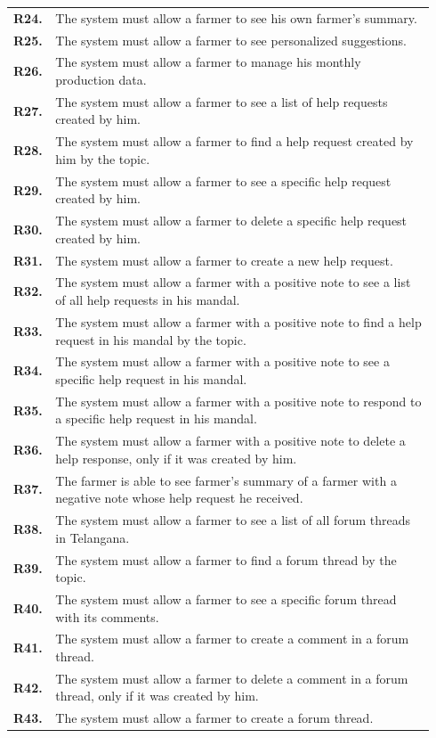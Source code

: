 \begin{longtable}{@{}p{0.06\linewidth} p{0.88\linewidth}}
	\textbf{R24.} & The system must allow a farmer to see his own farmer's summary.\\
	\textbf{R25.} & The system must allow a farmer to see personalized suggestions.\\
	\textbf{R26.} & The system must allow a farmer to manage his monthly production data.\\
	\textbf{R27.} & The system must allow a farmer to see a list of help requests created by him.\\
	\textbf{R28.} & The system must allow a farmer to find a help request created by him by the topic.\\
	\textbf{R29.} & The system must allow a farmer to see a specific help request created by him.\\
	\textbf{R30.} & The system must allow a farmer to delete a specific help request created by him.\\
	\textbf{R31.} & The system must allow a farmer to create a new help request.\\
	\textbf{R32.} & The system must allow a farmer with a positive note to see a list of all help requests in his mandal.\\
	\textbf{R33.} & The system must allow a farmer with a positive note to find a help request in his mandal by the topic.\\
	\textbf{R34.} & The system must allow a farmer with a positive note to see a specific help request in his mandal.\\
	\textbf{R35.} & The system must allow a farmer with a positive note to respond to a specific help request in his mandal.\\
	\textbf{R36.} & The system must allow a farmer with a positive note to delete a help response, only if it was created by him.\\
	\textbf{R37.} & The farmer is able to see farmer's summary of a farmer with a negative note whose help request he received. \\
	\textbf{R38.} & The system must allow a farmer to see a list of all forum threads in Telangana.\\
	\textbf{R39.} & The system must allow a farmer to find a forum thread by the topic.\\
	\textbf{R40.} & The system must allow a farmer to see a specific forum thread with its comments.\\
	\textbf{R41.} & The system must allow a farmer to create a comment in a forum thread.\\
	\textbf{R42.} & The system must allow a farmer to delete a comment in a forum thread, only if it was created by him.\\
	\textbf{R43.} & The system must allow a farmer to create a forum thread.\\
	

\end{longtable}
